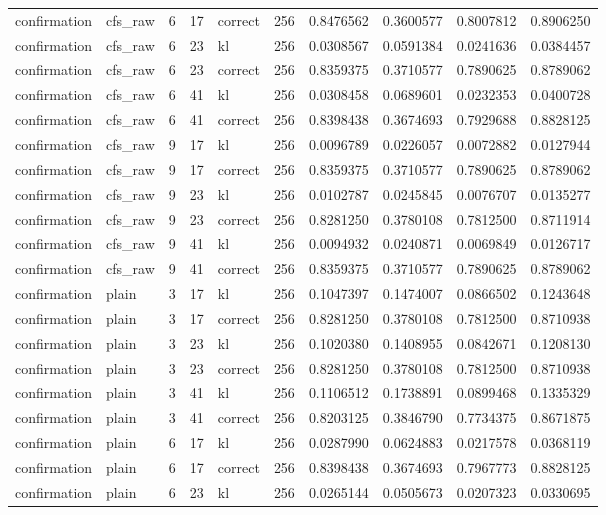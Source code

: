 \begin{tabular}{llrrlrrrrr}
confirmation & cfs_raw & 6 & 17 & correct & 256 & 0.8476562 & 0.3600577 & 0.8007812 & 0.8906250 \\
confirmation & cfs_raw & 6 & 23 & kl & 256 & 0.0308567 & 0.0591384 & 0.0241636 & 0.0384457 \\
confirmation & cfs_raw & 6 & 23 & correct & 256 & 0.8359375 & 0.3710577 & 0.7890625 & 0.8789062 \\
confirmation & cfs_raw & 6 & 41 & kl & 256 & 0.0308458 & 0.0689601 & 0.0232353 & 0.0400728 \\
confirmation & cfs_raw & 6 & 41 & correct & 256 & 0.8398438 & 0.3674693 & 0.7929688 & 0.8828125 \\
confirmation & cfs_raw & 9 & 17 & kl & 256 & 0.0096789 & 0.0226057 & 0.0072882 & 0.0127944 \\
confirmation & cfs_raw & 9 & 17 & correct & 256 & 0.8359375 & 0.3710577 & 0.7890625 & 0.8789062 \\
confirmation & cfs_raw & 9 & 23 & kl & 256 & 0.0102787 & 0.0245845 & 0.0076707 & 0.0135277 \\
confirmation & cfs_raw & 9 & 23 & correct & 256 & 0.8281250 & 0.3780108 & 0.7812500 & 0.8711914 \\
confirmation & cfs_raw & 9 & 41 & kl & 256 & 0.0094932 & 0.0240871 & 0.0069849 & 0.0126717 \\
confirmation & cfs_raw & 9 & 41 & correct & 256 & 0.8359375 & 0.3710577 & 0.7890625 & 0.8789062 \\
confirmation & plain & 3 & 17 & kl & 256 & 0.1047397 & 0.1474007 & 0.0866502 & 0.1243648 \\
confirmation & plain & 3 & 17 & correct & 256 & 0.8281250 & 0.3780108 & 0.7812500 & 0.8710938 \\
confirmation & plain & 3 & 23 & kl & 256 & 0.1020380 & 0.1408955 & 0.0842671 & 0.1208130 \\
confirmation & plain & 3 & 23 & correct & 256 & 0.8281250 & 0.3780108 & 0.7812500 & 0.8710938 \\
confirmation & plain & 3 & 41 & kl & 256 & 0.1106512 & 0.1738891 & 0.0899468 & 0.1335329 \\
confirmation & plain & 3 & 41 & correct & 256 & 0.8203125 & 0.3846790 & 0.7734375 & 0.8671875 \\
confirmation & plain & 6 & 17 & kl & 256 & 0.0287990 & 0.0624883 & 0.0217578 & 0.0368119 \\
confirmation & plain & 6 & 17 & correct & 256 & 0.8398438 & 0.3674693 & 0.7967773 & 0.8828125 \\
confirmation & plain & 6 & 23 & kl & 256 & 0.0265144 & 0.0505673 & 0.0207323 & 0.0330695 \\

\end{tabular}
